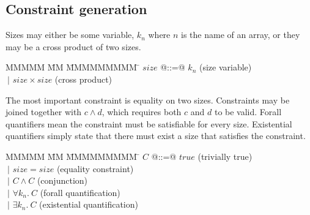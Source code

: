 


\newcommand{\constr}[1]{\llbracket #1 \rrbracket}


\subsection{Constraint generation}
Sizes may either be some variable, $k_n$ where $n$ is the name of an array, or they may be a cross product of two sizes.
\begin{tabbing}
MMMMM   \= MM \= MMMMMMMMM \= \kill
$size$  \> @::=@ \> $k_n$               \> (size variable) \\
        \> $~|$  \> $size \times size$  \> (cross product)
\end{tabbing}

The most important constraint is equality on two sizes.
Constraints may be joined together with $c \wedge d$, which requires both $c$ and $d$ to be valid.
Forall quantifiers mean the constraint must be satisfiable for every size.
Existential quantifiers simply state that there must exist a size that satisfies the constraint.
\begin{tabbing}
MMMMM   \= MM \= MMMMMMMMM \= \kill
$C$     \> @::=@ \> $true$              \> (trivially true)             \\
        \> $~|$  \> $size = size$       \> (equality constraint)        \\
        \> $~|$  \> $C \wedge C$        \> (conjunction)                \\
        \> $~|$  \> $\forall k_n.\ C$   \> (forall quantification)      \\
        \> $~|$  \> $\exists k_n.\ C$   \> (existential quantification)
\end{tabbing}

